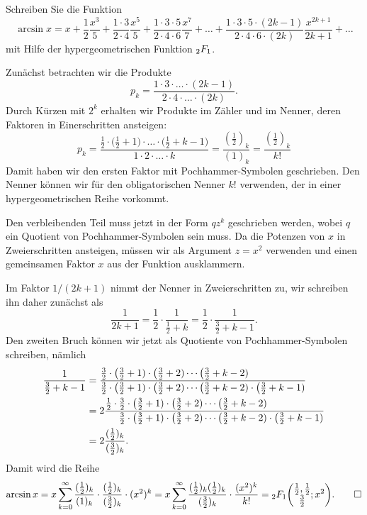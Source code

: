 Schreiben Sie die Funktion
\[
\arcsin x
=
x
+
\frac{1}{2} \frac{x^3}{5}
+
\frac{1\cdot 3}{2\cdot 4}\frac{x^5}{5}
+
\frac{1\cdot 3\cdot 5}{2\cdot 4\cdot 6}\frac{x^7}{7}
+
\dots
+
\frac{1\cdot 3\cdot 5\cdot (2k-1)}{2\cdot4\cdot 6\cdot (2k)}
\frac{x^{2k+1}}{2k+1}
+
\dots
\]
mit Hilfe der hypergeometrischen Funktion $\mathstrut_2F_1$.

\begin{loesung}
Zunächst betrachten wir die Produkte
\[
p_k
=
\frac{1\cdot 3\cdot \ldots \cdot (2k-1)}{2\cdot 4\cdot\ldots\cdot (2k)}.
\]
Durch Kürzen mit $2^k$ erhalten wir Produkte im Zähler und im Nenner, deren
Faktoren in Einerschritten ansteigen:
\[
p_k
=
\frac{
\frac12\cdot
\bigl(
\frac12+1\bigr)\cdot\ldots\cdot\bigl(\frac12+k-1\bigr)
}{
1\cdot 2\cdot \ldots \cdot k
}
=
\frac{(\frac12)_k}{(1)_k}
=
\frac{(\frac12)_k}{k!}
\]
Damit haben wir den ersten Faktor mit Pochhammer-Symbolen geschrieben.
Den Nenner können wir für den obligatorischen Nenner $k!$ verwenden,
der in einer hypergeometrischen Reihe vorkommt.

Den verbleibenden Teil muss jetzt in der Form $qz^k$ geschrieben werden,
wobei $q$ ein Quotient von Pochhammer-Symbolen sein muss.
Da die Potenzen von $x$ in Zweierschritten ansteigen, müssen wir als
Argument $z=x^2$ verwenden und einen gemeinsamen Faktor $x$ aus der
Funktion ausklammern.

Im Faktor $1/(2k+1)$ nimmt der Nenner in Zweierschritten zu, wir schreiben
ihn daher zunächst als
\[
\frac{1}{2k+1}
=
\frac{1}{2}\cdot \frac{1}{\frac12+k}
=
\frac{1}{2}\cdot\frac{1}{\frac32+k-1}.
\]
Den zweiten Bruch können wir jetzt als Quotiente von Pochhammer-Symbolen
schreiben, nämlich
\begin{align*}
\frac{1}{\frac32+k-1}
&=
\frac{
\frac32
\cdot
\bigl(\frac32+1)
\cdot
\bigl(\frac32+2)
\cdots
\bigl(\frac32+k-2)
\phantom{
\mathstrut
\cdot
\bigl(\frac32+k-1)
}
}{
\frac32
\cdot
\bigl(\frac32+1)
\cdot
\bigl(\frac32+2)
\cdots
\bigl(\frac32+k-2)
\cdot
\bigl(\frac32+k-1)
}
\\
&=
2
\frac{
\frac12
\cdot
\frac32
\cdot
\bigl(\frac32+1)
\cdot
\bigl(\frac32+2)
\cdots
\bigl(\frac32+k-2)
\phantom{
\mathstrut
\cdot
\bigl(\frac32+k-1)
}
}{
\phantom{
\frac12
\cdot
\mathstrut
}
\frac32
\cdot
\bigl(\frac32+1)
\cdot
\bigl(\frac32+2)
\cdots
\bigl(\frac32+k-2)
\cdot
\bigl(\frac32+k-1)
}
\\
&=
2\frac{(\frac12)_k}{(\frac32)_k}.
\end{align*}
Damit wird die Reihe
\[
\arcsin x
=
x
\sum_{k=0}^\infty
\frac{(\frac12)_k}{(1)_k}
\cdot
\frac{(\frac12)_k}{(\frac32)_k}
\cdot
(x^2)^k
=
x
\sum_{k=0}^\infty
\frac{(\frac12)_k(\frac12)_k}{(\frac32)_k}
\cdot
\frac{(x^2)^k}{k!}
=
\mathstrut_2F_1\biggl(
\begin{matrix}
\frac12,\frac12\\ \frac32
\end{matrix}
;x^2
\biggr).
\qedhere
\]
\end{loesung}
